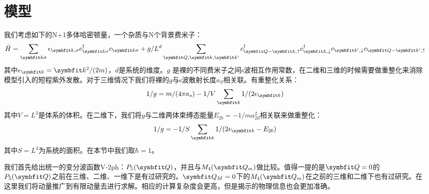 \section{模型}\label{3sec:method}
我们考虑如下的N+1多体哈密顿量，一个杂质与N个背景费米子：
\begin{equation}
\label{chap3eq:H}
\hat{H}=\sum_{\Vector{k}\sigma} \epsilon_{\Vector{k},\sigma} c_{\Vector{k} \sigma}^{\dagger} c_{\Vector{k} \sigma}+g/L^d \sum_{\Vector{Q}, \Vector{k}, \Vector{k}^{\prime}} c_{\Vector{Q}-\Vector{k}, \uparrow}^{\dagger} c_{\Vector{k}, \downarrow}^{\dagger} c_{\Vector{k}^{\prime}, \downarrow} c_{\Vector{Q}-\Vector{k}^{\prime}, \uparrow}
\end{equation}
其中$\epsilon_{\Vector{k}}=\Vector{k}^2/(2m)$，$d$是系统的维度。$g$ 是裸的不同费米子之间s波相互作用常数，在二维和三维的时候需要做重整化来消除模型引入的短程紫外发散。对于三维情况下我们将裸的$g$与s波散射长度$a_S$相关联。有重整化关系：
\begin{equation}
1/g=m/(4\pi a_s)-1/V \sum_{\Vector{k}}1/(2\epsilon_{\Vector{k}})
\end{equation}
其中$V=L^3$是体系的体积。在二维下，我们将$g$与二维两体束缚态能量$E_{2b}=-1/ma_{2d}^2$相关联来做重整化：
\begin{equation}
1/g=-1/S \sum_{\Vector{k}}1/(2\epsilon_{\Vector{k}}-E_{2b})
\end{equation}
其中$S=L^2$为系统的面积。在本节中我们取$\hbar=1$。

我们首先给出统一的变分波函数V-2ph：$P_5(\Vector{Q})$，并且与$M_4(\Vector{Q}_m)$做比较。值得一提的是$\Vector{Q}=0$的$P_5(\Vector{Q})$之前在三维、二维、一维下是有过研究的。$\Vector{Q}_M=0$下的$M_4(\Vector{Q}_m)$在之前的三维和二维下也有过研究。在这里我们将动量推广到有限动量去进行求解。相应的计算复杂度会更高，但是揭示的物理信息也会更加准确。

